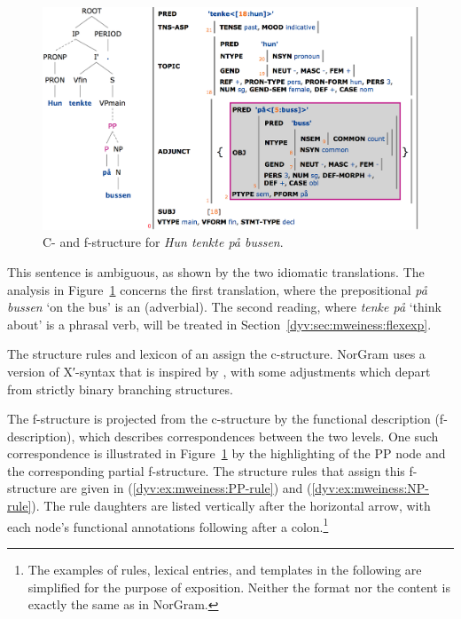 \documentclass[output=paper]{langsci/langscibook}
\begin{document}
\begin{figure}
  \includegraphics[width=\textwidth]{figures/tenke-paa-bussen-highlight.png}
  \caption{C- and f-structure for \textit{Hun tenkte på bussen}.}
  \label{dyv:fig:mweiness:thinking-while-on-bus}
\end{figure}

This sentence is ambiguous, as shown by the two idiomatic translations.
The analysis in Figure~\ref{dyv:fig:mweiness:thinking-while-on-bus} concerns the first translation, where the prepositional  \textit{på bussen} `on the bus' is an  (adverbial).
The second reading, where \textit{tenke på} `think about’ is a phrasal verb, will be treated in Section~\ref{dyv:sec:mweiness:flexexp}.

The  structure rules and lexicon of an   assign the c-struc\-ture.
NorGram uses a version of X′-syntax that is inspired by \citet{bresnanlfs}, with some adjustments which depart from strictly binary branching structures.

The f-structure is projected from the c-structure by the functional description (f-description), which describes correspondences between the two levels.
One such correspondence is illustrated in Figure~\ref{dyv:fig:mweiness:thinking-while-on-bus} by the highlighting of the \textsf{PP} node and the corresponding partial f-structure.
The  structure rules that assign this f-structure are given in (\ref{dyv:ex:mweiness:PP-rule}) and (\ref{dyv:ex:mweiness:NP-rule}).
The rule daughters are listed vertically after the horizontal arrow, with each node's functional annotations following after a colon.\footnote{The examples of rules, lexical entries, and templates in the following are simplified for the purpose of exposition. Neither the format nor the content is exactly the same as in NorGram.}
\end{document}
